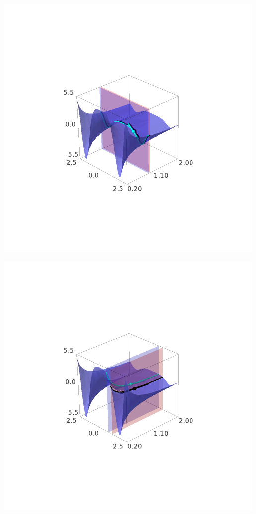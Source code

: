 \documentclass[../main.tex]{subfiles}
\begin{document}
\begin{solucao}
\begin{enumerate}[label=\arabic*.]
				\begin{center}
					\begin{minipage}{0.45\textwidth}
						\centering
						\includegraphics[width=\textwidth]{imagens/lista04/picture_lista04.02_q01_item12.01.png}
					\end{minipage}
					\hfill
					\begin{minipage}{0.45\textwidth}
						\centering
						\includegraphics[width=\textwidth]{imagens/lista04/picture_lista04.02_q01_item12.02.png}

\end{minipage}
\end{center}
\end{enumerate}
\end{solucao}
\end{document}
